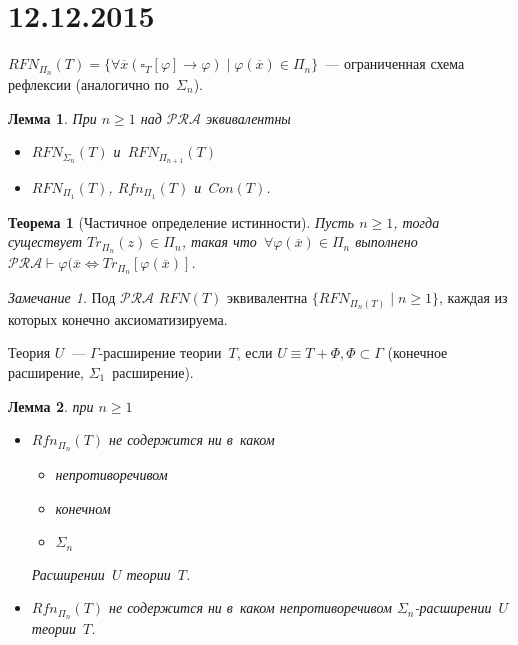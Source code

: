 \documentclass{article}
\newtheorem{theorem}{Теорема}
\newtheorem{lemma}{Лемма}
\theoremstyle{remark}
\newtheorem*{remark}{Замечание}
\renewcommand{\ge}{\geqslant}
\renewcommand{\phi}{\varphi}
\begin{document}
\section*{12.12.2015}

$RFN_{\Pi_n}(T) = \{ \forall \overline{x} (\square_T [\phi] \rightarrow \phi)
\mid \phi(\overline{x}) \in {\Pi_n}\}$~--- ограниченная схема рефлексии
(аналогично по~$\Sigma_n$).

\begin{lemma}
  При $n \ge 1$ над $\mathcal{PRA}$ эквивалентны
  \begin{itemize}
    \item $RFN_{\Sigma_n}(T)$ и~$RFN_{\Pi_{n+1}}(T)$
    \item $RFN_{\Pi_1}(T)$, $Rfn_{\Pi_1}(T)$ и~$Con(T)$.
  \end{itemize}
\end{lemma}

\begin{theorem}[Частичное определение истинности]
  Пусть $n \ge 1$, тогда существует $Tr_{\Pi_n}(z) \in \Pi_n$, такая
  что~$\forall \phi(\overline{x}) \in \Pi_n$ выполнено~$\mathcal{PRA} \vdash
  \phi(\overline{x} \Leftrightarrow Tr_{\Pi_n}[\phi(\overline{x})]$.
\end{theorem}
\begin{remark}
  Под $\mathcal{PRA}$ $RFN(T)$ эквивалентна $\{RFN_{\Pi_n(T)} \mid n \ge 1\}$,
  каждая из которых конечно аксиоматизируема.
\end{remark}

Теория $U$~--- $\Gamma$-расширение теории~$T$, если $U \equiv T + \Phi, \Phi
\subset \Gamma$ (конечное расширение, $\Sigma_1$~расширение).

\begin{lemma}
  при $n \ge 1$
  \begin{itemize}
    \item
      $Rfn_{\Pi_n}(T)$ не содержится ни в~каком
      \begin{itemize}
        \item непротиворечивом
        \item конечном
        \item $\Sigma_n$
      \end{itemize}
      Расширении~$U$ теории~$T$.
    \item
      $Rfn_{\Pi_n}(T)$ не содержится ни в~каком непротиворечивом
      $\Sigma_n$-расширении~$U$ теории~$T$.
  \end{itemize}
\end{lemma}
\end{document}
